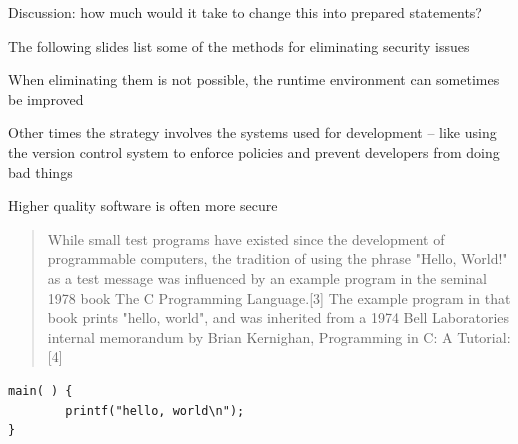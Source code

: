 \documentclass[Screen16to9,17pt]{foils}
\begin{document}
Discussion: how much would it take to change this into prepared statements?






\begin{list2}
\item The following slides list some of the methods for eliminating security issues
\item When eliminating them is not possible, the runtime environment can sometimes be improved
\item Other times the strategy involves the systems used for development -- like using the version control system to enforce policies and prevent developers from doing bad things
\end{list2}


\centerline{Higher quality software is often more secure}



\begin{quote}
While small test programs have existed since the development of programmable computers, the tradition of using the phrase "Hello, World!" as a test message was influenced by an example program in the seminal 1978 book The C Programming Language.[3] The example program in that book prints "hello, world", and was inherited from a 1974 Bell Laboratories internal memorandum by Brian Kernighan, Programming in C: A Tutorial:[4]
\end{quote}

\begin{verbatim}
main( ) {
        printf("hello, world\n");
}
\end{verbatim}
\end{document}
